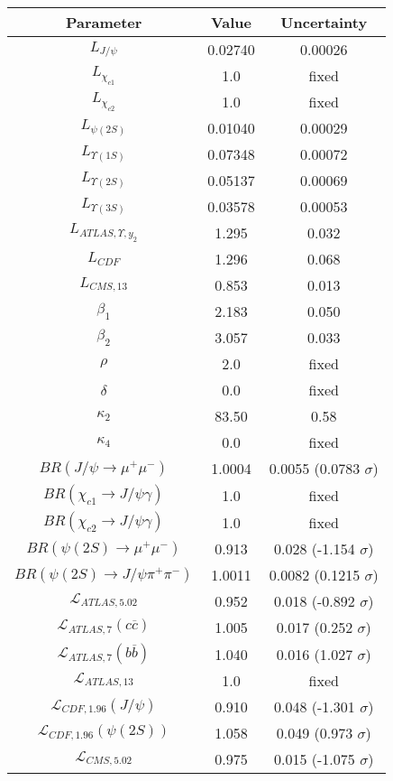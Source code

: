 \begin{table}[h!]
\centering
\begin{tabular}{c|c|c}
Parameter & Value & Uncertainty \\
\hline
$L_{J/\psi}$ & 0.02740 & 0.00026 \\
$L_{\chi_{c1}}$ & 1.0 & fixed \\
$L_{\chi_{c2}}$ & 1.0 & fixed \\
$L_{\psi(2S)}$ & 0.01040 & 0.00029 \\
$L_{\Upsilon(1S)}$ & 0.07348 & 0.00072 \\
$L_{\Upsilon(2S)}$ & 0.05137 & 0.00069 \\
$L_{\Upsilon(3S)}$ & 0.03578 & 0.00053 \\
$L_{ATLAS,\Upsilon,y_2}$ & 1.295 & 0.032 \\
$L_{CDF}$ & 1.296 & 0.068 \\
$L_{CMS,13}$ & 0.853 & 0.013 \\
$\beta_1$ & 2.183 & 0.050 \\
$\beta_2$ & 3.057 & 0.033 \\
$\rho$ & 2.0 & fixed \\
$\delta$ & 0.0 & fixed \\
$\kappa_2$ & 83.50 & 0.58 \\
$\kappa_4$ & 0.0 & fixed \\
$BR(J/\psi\rightarrow\mu^+\mu^-)$ & 1.0004 & 0.0055 (0.0783 $\sigma$) \\
$BR(\chi_{c1}\rightarrow J/\psi\gamma)$ & 1.0 & fixed \\
$BR(\chi_{c2}\rightarrow J/\psi\gamma)$ & 1.0 & fixed \\
$BR(\psi(2S)\rightarrow\mu^+\mu^-)$ & 0.913 & 0.028 (-1.154 $\sigma$) \\
$BR(\psi(2S)\rightarrow J/\psi\pi^+\pi^-)$ & 1.0011 & 0.0082 (0.1215 $\sigma$) \\
$\mathcal L_{ATLAS,5.02}$ & 0.952 & 0.018 (-0.892 $\sigma$) \\
$\mathcal L_{ATLAS,7}(c\overline c)$ & 1.005 & 0.017 (0.252 $\sigma$) \\
$\mathcal L_{ATLAS,7}(b\overline b)$ & 1.040 & 0.016 (1.027 $\sigma$) \\
$\mathcal L_{ATLAS,13}$ & 1.0 & fixed \\
$\mathcal L_{CDF,1.96}(J/\psi)$ & 0.910 & 0.048 (-1.301 $\sigma$) \\
$\mathcal L_{CDF,1.96}(\psi(2S))$ & 1.058 & 0.049 (0.973 $\sigma$) \\
$\mathcal L_{CMS,5.02}$ & 0.975 & 0.015 (-1.075 $\sigma$) \\

\end{tabular}
\end{table}
